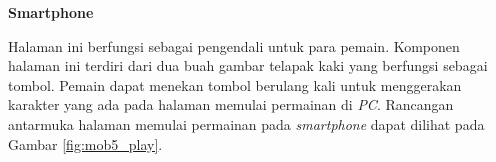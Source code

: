 \begin{enumerate}
%		
%		
%		
%		

	\textbf{Smartphone}
	
	Halaman ini berfungsi sebagai pengendali untuk para pemain. Komponen halaman ini terdiri dari dua buah gambar telapak kaki yang berfungsi sebagai tombol. Pemain dapat menekan tombol berulang kali untuk menggerakan karakter yang ada pada halaman memulai permainan di \textit{PC}. Rancangan antarmuka halaman memulai permainan pada \textit{smartphone} dapat dilihat pada Gambar \ref{fig:mob5_play}.
	

\end{enumerate}
